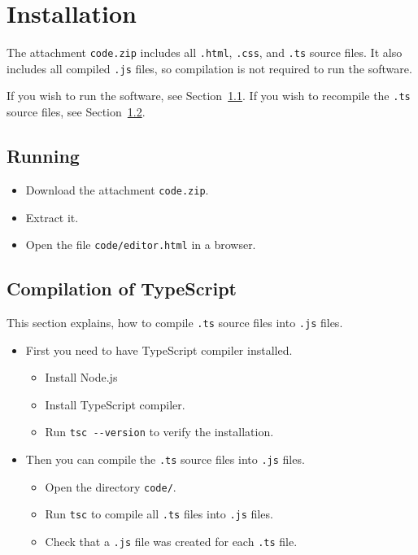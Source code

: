 \chapter{Installation}\label{ch:a}

The attachment \texttt{code.zip} includes all \texttt{.html}, \texttt{.css}, and \texttt{.ts} source files.
It also includes all compiled \texttt{.js} files, so compilation is not required to run the software.

If you wish to run the software, see Section~\ref{sec:running}.
If you wish to recompile the \texttt{.ts} source files, see Section~\ref{sec:compilation}.

\section{Running}\label{sec:running}

\begin{itemize}
    \item Download the attachment \texttt{code.zip}.
    \item Extract it.
    \item Open the file \texttt{code/editor.html} in a browser.
\end{itemize}

\section{Compilation of TypeScript}\label{sec:compilation}

This section explains, how to compile \texttt{.ts} source files into \texttt{.js} files.

\begin{itemize}
    \item First you need to have TypeScript compiler installed.

    \begin{itemize}
        \item Install Node.js
        \item Install TypeScript compiler.
        \item Run \texttt{tsc -{}-version} to verify the installation.
    \end{itemize}

    \item Then you can compile the \texttt{.ts} source files into \texttt{.js} files.

    \begin{itemize}
        \item Open the directory \texttt{code/}.
        \item Run \texttt{tsc} to compile all \texttt{.ts} files into \texttt{.js} files.
        \item Check that a \texttt{.js} file was created for each \texttt{.ts} file.
    \end{itemize}
\end{itemize}
